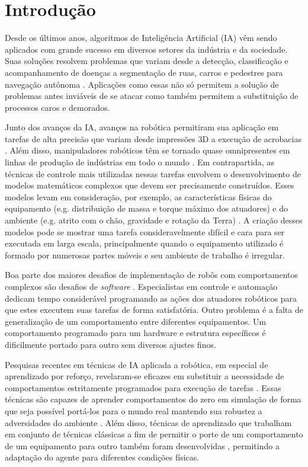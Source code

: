 
\chapter{Introdução}
\label{cap:intro}

Desde os últimos anos, algoritmos de Inteligência Artificial (IA) vêm sendo aplicados com grande sucesso em diversos setores da indústria e da sociedade. Suas soluções resolvem problemas que variam desde a detecção, classificação e acompanhamento de doenças \cite{dldiabetic, dlalzheimer} a segmentação de ruas, carros e pedestres para navegação autônoma \cite{pan2017agile, autonomousvehicle}. Aplicações como essas não só permitem a solução de problemas antes inviáveis de se atacar como também permitem a substituição de processos caros e demorados.

Junto dos avanços da IA, avanços na robótica permitiram sua aplicação em tarefas de alta precisão que variam desde impressões 3D a execução de acrobacias \cite{atlaspaper}. Além disso, manipuladores robóticos têm se tornado quase omnipresentes em linhas de produção de indústrias em todo o mundo \cite{automatedassembly}. Em contrapartida, as técnicas de controle mais utilizadas nessas tarefas envolvem o desenvolvimento de modelos matemáticos complexos que devem ser precisamente construídos. Esses modelos levam em consideração, por exemplo, as características físicas do equipamento (e.g. distribuição de massa e torque máximo dos atuadores) e do ambiente (e.g. atrito com o chão, gravidade e rotação da Terra) \cite{coriolis}. A criação desses modelos pode se mostrar uma tarefa consideravelmente difícil e cara para ser executada em larga escala, principalmente quando o equipamento utilizado é formado por numerosas partes móveis e seu ambiente de trabalho é irregular.

Boa parte dos maiores desafios de implementação de robôs com comportamentos complexos são desafios de \textit{software} \cite{dlrobotics}. Especialistas em controle e automação dedicam tempo considerável programando as ações dos atuadores robóticos para que estes executem suas tarefas de forma satisfatória. Outro problema é a falta de generalização de um comportamento entre diferentes equipamentos. Um comportamento programado para um hardware e estrutura específicos é dificilmente portado para outro sem diversos ajustes finos.

Pesquisas recentes em técnicas de IA aplicada a robótica, em especial de aprendizado por reforço, revelaram-se eficazes em substituir a necessidade de comportamentos estritamente programados para execução de tarefas \cite{openaihand, rlindustrial}. Essas técnicas são capazes de aprender comportamentos do zero em simulação de forma que seja possível portá-los para o mundo real mantendo sua robustez a adversidades do ambiente \cite{Tobin_2017}. Além disso, técnicas de aprendizado que trabalham em conjunto de técnicas clássicas a fim de permitir o porte de um comportamento de um equipamento para outro também foram desenvolvidas \cite{rlforcontrol}, permitindo a adaptação do agente para diferentes condições físicas.

